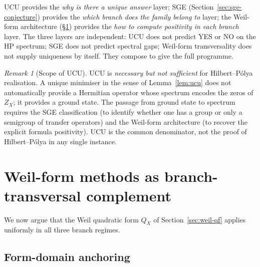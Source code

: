 \documentclass[11pt]{article}
\theoremstyle{definition}
\theoremstyle{remark}
\newtheorem{remark}[theorem]{Remark}
\begin{document}
UCU provides the \emph{why is there a unique answer} layer; SGE
(Section~\ref{sec:sge-conjecture}) provides the \emph{which branch does the
family belong to} layer; the Weil-form architecture
(\S\ref{sec:weil-transversal}) provides the \emph{how to compute
positivity in each branch} layer. The three layers are
independent: UCU does not predict YES or NO on the HP spectrum;
SGE does not predict spectral gaps; Weil-form transversality does
not supply uniqueness by itself. They compose to give the full
programme.

\begin{remark}[Scope of UCU]\label{rem:ucu-scope}
UCU is \emph{necessary but not sufficient} for Hilbert--P\'olya
realisation. A unique minimiser in the sense of
Lemma~\ref{lem:ucu} does not automatically provide a Hermitian
operator whose spectrum encodes the zeros of $Z_X$; it provides a
ground state. The passage from ground state to spectrum requires
the SGE classification (to identify whether one has a group or
only a semigroup of transfer operators) and the Weil-form
architecture (to recover the explicit formula positivity). UCU
is the common denominator, not the proof of Hilbert--P\'olya in
any single instance.
\end{remark}

\section{Weil-form methods as branch-transversal complement}
\label{sec:weil-transversal}

We now argue that the Weil quadratic form $Q_X$ of
Section~\ref{sec:weil-qf} applies uniformly in all three branch
regimes.

\subsection{Form-domain anchoring}
\label{sec:weil-form-domain}
\end{document}

